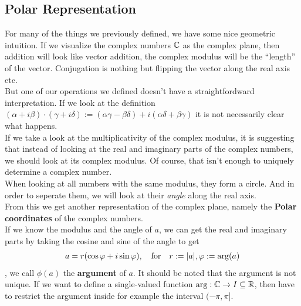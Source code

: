 \subsection{Polar Representation}
For many of the things we previously defined, we have some nice geometric intuition. If we visualize the complex numbers $\mathbb{C}$ as the complex plane, then addition will look like vector addition, the complex modulus will be the ``length'' of the vector. Conjugation is nothing but flipping the vector along the real axis etc.\\

But one of our operations we defined doesn't have a straightfordward interpretation. If we look at the definition $(\alpha + i \beta) \cdot (\gamma + i \delta) := (\alpha \gamma - \beta \delta) + i(\alpha \delta + \beta \gamma)$ it is not necessarily clear what happens.\\

If we take a look at the multiplicativity of the complex modulus, it is suggesting that instead of looking at the real and imaginary parts of the complex numbers, we should look at its complex modulus. Of course, that isn't enough to uniquely determine a complex number.\\
When looking at all numbers with the same modulus, they form a circle. And in order to seperate them, we will look at their \emph{angle} along the real axis.\\

From this we get another representation of the complex plane, namely the \textbf{Polar coordinates} of the complex numbers.\\
If we know the modulus and the angle of $a$, we can get the real and imaginary parts by taking the cosine and sine of the angle to get
\begin{align*}
				a = r(\cos\varphi + i \sin\varphi), \quad \text{for} \quad r := \vert a\vert, \varphi := \arg(a)
\end{align*}
, we call $\phi(a)$ the \textbf{argument} of $a$. It should be noted that the argument is not unique. If we want to define a single-valued function $\arg: \mathbb{C} \to I \subseteq \mathbb{R}$, then have to restrict the argument inside for example the interval $(-\pi, \pi]$.\\

